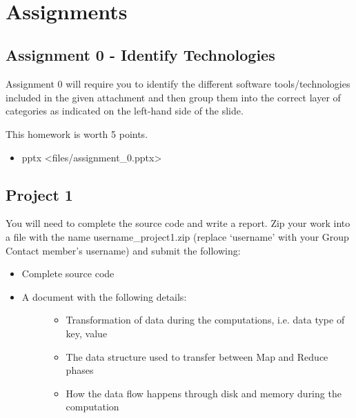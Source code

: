 \FILENAME\

\section{Assignments}\label{assignments}

\subsection{Assignment 0 - Identify Technologies}\label{assignment-0}

Assignment 0 will require you to identify the different software
tools/technologies included in the given attachment and then group
them into the correct layer of categories as indicated on the
left-hand side of the slide.

This homework is worth 5 points.

\begin{itemize}

\item
  pptx \textless{}files/assignment\_0.pptx\textgreater{}
\end{itemize}

\subsection{Project 1}\label{project-1}

You will need to complete the source code and write a report. Zip your
work into a file with the name username\_project1.zip (replace
`username' with your Group Contact member's username) and submit the
following:

\begin{itemize}
\item
  Complete source code
\item
  \begin{description}
  \item[A document with the following details:]
  \begin{itemize}

  \item
    Transformation of data during the computations, i.e. data type of
    key, value
  \item
    The data structure used to transfer between Map and Reduce phases
  \item
    How the data flow happens through disk and memory during the
    computation
  \end{itemize}
  \end{description}
\end{itemize}

